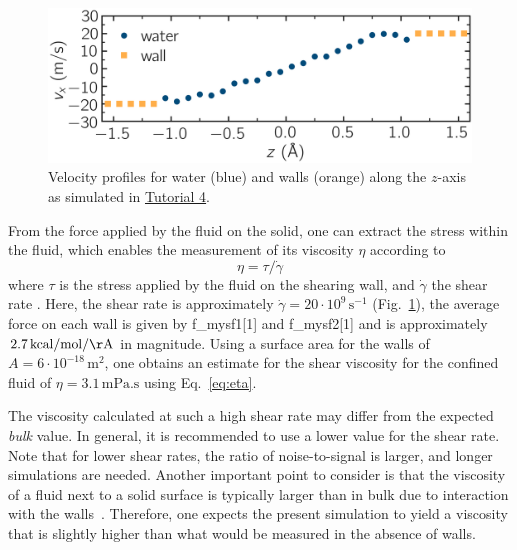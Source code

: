\documentclass[9pt,tutorial]{livecoms}
\newcommand{\lmpcmd}[1]{\hspace{0pt}\colorbox{listing}{\textcolor{command}{\small{#1}}}\hspace{0pt}} %
\begin{document}
\begin{figure}
\centering
\includegraphics[width=\linewidth]{NANOSHEAR-profiles}
\caption{Velocity profiles for water (blue) and walls (orange) along the $z$-axis as
simulated in \hyperref[sheared-confined-label]{Tutorial 4}.}
\label{fig:NANOSHEAR-profiles}
\end{figure}

From the force applied by the fluid on the solid, one can extract the stress
within the fluid, which enables the measurement of its viscosity $\eta$
according to
\begin{equation}
\eta = \tau / \dot{\gamma}
\label{eq:eta}
\end{equation}
where $\tau$ is the stress applied by
the fluid on the shearing wall, and $\dot{\gamma}$ the shear rate
\cite{gravelle2021violations}.  Here, the shear rate is
approximately $\dot{\gamma} = 20 \cdot 10^9\,\text{s}^{-1}$ (Fig.~\ref{fig:NANOSHEAR-profiles}),
the average force on each wall is given by \lmpcmd{f\_mysf1[1]} and \lmpcmd{f\_mysf2[1]}
and is approximately $2.7\,\mathrm{kcal/mol/\AA}$ in magnitude.  Using a surface area
for the walls of $A = 6 \cdot 10^{-18}\,\text{m}^2$, one obtains an estimate for
the shear viscosity for the confined fluid of $\eta = 3.1\,\text{mPa.s}$ using Eq.~\eqref{eq:eta}. 

\begin{note}
The viscosity calculated at such a high shear rate may differ from the expected
\emph{bulk} value.  In general, it is recommended to use a lower value for the
shear rate.  Note that for lower shear rates, the ratio of noise-to-signal is
larger, and longer simulations are needed.  Another important point to consider
is that the viscosity of a fluid next to a solid surface is typically larger
than in bulk due to interaction with the walls~\cite{wolde-kidanInterplayInterfacialViscosity2021}.
Therefore, one expects the present simulation to yield a viscosity that is slightly
higher than what would be measured in the absence of walls.
\end{note}
\end{document}
